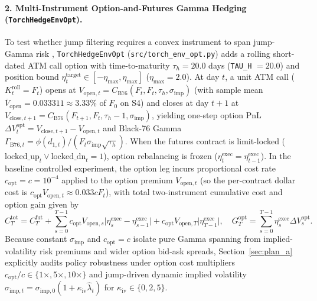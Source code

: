 \documentclass[11pt,a4paper]{article}
\begin{document}
\paragraph{2. Multi-Instrument Option-and-Futures Gamma Hedging (\texttt{TorchHedgeEnvOpt}).}
To test whether jump filtering requires a convex instrument to span jump-Gamma risk \citep{Bakshi1997,CarbonneauGodin2024,Shakeel2026}, \texttt{TorchHedgeEnvOpt} (\texttt{src/torch\_env\_opt.py}) adds a rolling short-dated ATM call option with time-to-maturity $\tau_h = 20.0$ days (\texttt{TAU\_H} $= 20.0$) and position bound $\eta_t^{\text{target}} \in [-\eta_{\max}, \eta_{\max}]$ ($\eta_{\max} = 2.0$). At day $t$, a unit ATM call ($K_t^{\text{roll}} = F_t$) opens at $V_{\text{open},t} = C_{\text{B76}}(F_t, F_t, \tau_h, \sigma_{\text{imp}})$ (with sample mean $\overline{V}_{\text{open}} = 0.033311 \approx 3.33\%$ of $F_0$ on S4) and closes at day $t+1$ at $V_{\text{close},t+1} = C_{\text{B76}}(F_{t+1}, F_t, \tau_h - 1, \sigma_{\text{imp}})$, yielding one-step option PnL $\Delta V_t^{\text{opt}} = V_{\text{close},t+1} - V_{\text{open},t}$ and Black-76 Gamma $\Gamma_{\text{B76},t} = \phi(d_{1,t}) / (F_t \sigma_{\text{imp}}\sqrt{\tau_h})$. When the futures contract is limit-locked ($\text{locked\_up}_t \lor \text{locked\_dn}_t = 1$), option rebalancing is frozen ($\eta_t^{\text{exec}} = \eta_{t-1}^{\text{exec}}$). In the baseline controlled experiment, the option leg incurs proportional cost rate $c_{\text{opt}} = c = 10^{-4}$ applied to the option premium $V_{\text{open},t}$ (so the per-contract dollar cost is $c_{\text{opt}} V_{\text{open},t} \approx 0.033 c F_t$), with total two-instrument cumulative cost and option gain given by
\begin{equation}
  C_T^{\text{tot}} = C_T^{\text{fut}} + \sum_{s=0}^{T-1} c_{\text{opt}} V_{\text{open},s}\big|\eta_s^{\text{exec}} - \eta_{s-1}^{\text{exec}}\big| + c_{\text{opt}} V_{\text{open},T}\big|\eta_{T-1}^{\text{exec}}\big|, \quad G_T^{\text{opt}} = \sum_{s=0}^{T-1} \eta_s^{\text{exec}}\Delta V_s^{\text{opt}}.
  \label{eq:wealth_2d}
\end{equation}
Because constant $\sigma_{\text{imp}}$ and $c_{\text{opt}} = c$ isolate pure Gamma spanning from implied-volatility risk premiums and wider option bid-ask spreads, Section~\ref{sec:plan_a} explicitly audits policy robustness under option cost multipliers $c_{\text{opt}}/c \in \{1\times, 5\times, 10\times\}$ and jump-driven dynamic implied volatility $\sigma_{\text{imp},t} = \sigma_{\text{imp},0}(1 + \kappa_{\text{iv}}\hat{\lambda}_t)$ for $\kappa_{\text{iv}} \in \{0, 2, 5\}$.
\end{document}
